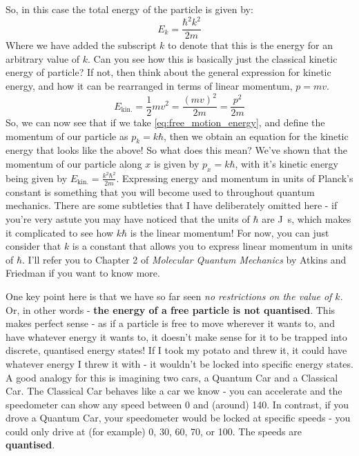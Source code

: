\documentclass{memoir}[11pt,oneside,a4paper,openany]
\begin{document}
So, in this case the total energy of the particle is given by:
\begin{equation}\label{eq:free_motion_energy}
E_k = \frac{\hbar^2k^2}{2m}
\end{equation}
Where we have added the subscript $k$ to denote that this is the energy for an arbitrary value of $k$. Can you see how this is basically just the classical kinetic energy of particle? If not, then think about the general expression for kinetic energy, and how it can be rearranged in terms of linear momentum, $p=mv$.
\begin{equation}
	E_\mathrm{kin.} = \frac{1}{2}mv^2 = \frac{(mv)^2}{2m} = \frac{p^2}{2m}
\end{equation}
So, we can now see that if we take \autoref{eq:free_motion_energy}, and define the momentum of our particle as $p_k = k\hbar$, then we obtain an equation for the kinetic energy that looks like the above! So what does this mean? We've shown that the momentum of our particle along $x$ is given by $p_x = k\hbar$, with it's kinetic energy being given by $E_\mathrm{kin.} = \frac{k^2\hbar^2}{2m}$. Expressing energy and momentum in units of Planck's constant is something that you will become used to throughout quantum mechanics. There are some subtleties that I have deliberately omitted here - if you're very astute you may have noticed that the units of $\hbar$ are \si{\joule\second}, which makes it complicated to see how $k\hbar$ is the linear momentum! For now, you can just consider that $k$ is a constant that allows you to express linear momentum in units of $\hbar$. I'll refer you to Chapter 2 of \emph{Molecular Quantum Mechanics} by Atkins and Friedman if you want to know more. 

One key point here is that we have so far seen \emph{no restrictions on the value of $k$}. Or, in other words - \textbf{the energy of a free particle is not quantised}. This makes perfect sense - as if a particle is free to move wherever it wants to, and have whatever energy it wants to, it doesn't make sense for it to be trapped into discrete, quantised energy states! If I took my potato and threw it, it could have whatever energy I threw it with - it wouldn't be locked into specific energy states. A good analogy for this is imagining two cars, a Quantum Car and a Classical Car. The Classical Car behaves like a car we know - you can accelerate and the speedometer can show any speed between 0 and (around) \SI{140}{\mph}. In contrast, if you drove a Quantum Car, your speedometer would be locked at specific speeds - you could only drive at (for example) 0, 30, 60, 70, or \SI{100}{\mph}. The speeds are \textbf{quantised}.   
\end{document}
